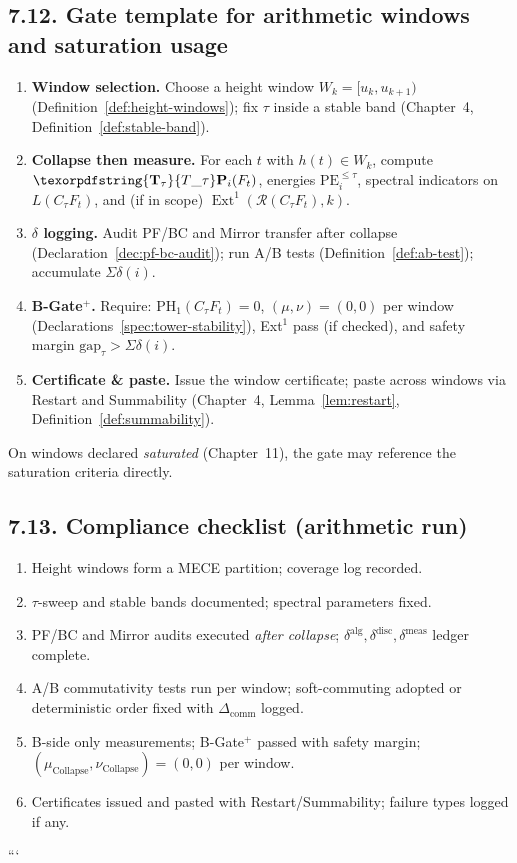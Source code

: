 \documentclass[11pt]{article}
\DeclareMathOperator{\Ext}{Ext}
\DeclareRobustCommand{\hyp}{\nobreakdash-}
\newcommand{\Rfun}{\mathcal{R}}
\numberwithin{equation}{section}
\theoremstyle{definition}
\DeclareRobustCommand{\Ttau}{\texorpdfstring{\ensuremath{\mathbf{T}_{\tau}}}{T\_\tau}}
\DeclareRobustCommand{\muc}{\mu_{\mathrm{Collapse}}}
\DeclareRobustCommand{\nuc}{\nu_{\mathrm{Collapse}}}
\begin{document}
\subsection*{7.12. Gate template for arithmetic windows and saturation usage}
\begin{enumerate}
  \item \textbf{Window selection.} Choose a height window \(W_k=[u_k,u_{k+1})\) (Definition~\ref{def:height-windows}); fix \(\tau\) inside a stable band (Chapter~4, Definition~\ref{def:stable-band}).
  \item \textbf{Collapse then measure.} For each \(t\) with \(h(t)\in W_k\), compute \(\Ttau\mathbf{P}_i(F_t)\), energies \(\mathrm{PE}_i^{\le\tau}\), spectral indicators on \(L(C_\tau F_t)\), and (if in scope) \(\Ext^1(\Rfun(C_\tau F_t),k)\).
  \item \textbf{$\delta$ logging.} Audit PF/BC and Mirror transfer after collapse (Declaration~\ref{dec:pf-bc-audit}); run A/B tests (Definition~\ref{def:ab-test}); accumulate \(\Sigma\delta(i)\).
  \item \textbf{B\hyp Gate$^{+}$.} Require: \(\mathrm{PH}_1(C_\tau F_t)=0\), \((\mu,\nu)=(0,0)\) per window (Declarations~\ref{spec:tower-stability}), Ext\(^1\) pass (if checked), and safety margin \(\mathrm{gap}_\tau>\Sigma\delta(i)\).
  \item \textbf{Certificate \& paste.} Issue the window certificate; paste across windows via Restart and Summability (Chapter~4, Lemma~\ref{lem:restart}, Definition~\ref{def:summability}).
\end{enumerate}
On windows declared \emph{saturated} (Chapter~11), the gate may reference the saturation criteria directly.

\subsection*{7.13. Compliance checklist (arithmetic run)}
\begin{enumerate}
  \item Height windows form a MECE partition; coverage log recorded.
  \item \(\tau\)\hyp sweep and stable bands documented; spectral parameters fixed.
  \item PF/BC and Mirror audits executed \emph{after collapse}; \(\delta^{\mathrm{alg}},\delta^{\mathrm{disc}},\delta^{\mathrm{meas}}\) ledger complete.
  \item A/B commutativity tests run per window; soft\hyp commuting adopted or deterministic order fixed with \(\Delta_{\mathrm{comm}}\) logged.
  \item B\hyp side only measurements; B\hyp Gate$^{+}$ passed with safety margin; \((\muc,\nuc)=(0,0)\) per window.
  \item Certificates issued and pasted with Restart/Summability; failure types logged if any.
\end{enumerate}
```
\end{document}
